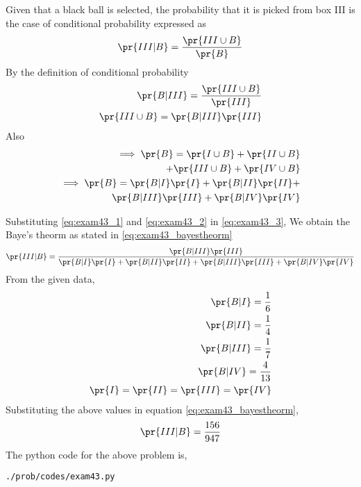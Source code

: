 Given that a black ball is selected, the probability that it is picked from box III is the case of conditional probability expressed as
\begin{align}
\pr{III|B}=\frac{\pr{III \cup B}}{\pr{B}}
\label{eq:exam43_3}
\end{align}
By the definition of conditional probability
\begin{align}
\pr{B|III}=\frac{\pr{III \cup B}}{\pr{III}}
\\
\pr{III \cup B} = \pr{B|III}\pr{III}
\label{eq:exam43_1}
\end{align}
Also 
\begin{align}
\implies \pr{B}=\pr{I \cup B}+\pr{II \cup B}
\\ +\pr{III \cup B}+\pr{IV \cup B}
\\
\implies \pr{B} = \pr{B|I} \pr{I}+\pr{B|II} \pr{II}+
\\ \pr{B|III} \pr{III}+\pr{B|IV} \pr{IV}
\label{eq:exam43_2}
\end{align}

Substituting \eqref{eq:exam43_1} and \eqref{eq:exam43_2} in \eqref{eq:exam43_3}, We obtain the Baye's theorm as stated in \eqref{eq:exam43_bayestheorm}
\begin{align}
\pr{III|B}= \frac{\pr{B|III} \pr{III}}{\pr{B|I} \pr{I}+\pr{B|II} \pr{II}+\pr{B|III} \pr{III}+\pr{B|IV} \pr{IV}}
\label{eq:exam43_bayestheorm}
\end{align}
From the given data,
\begin{align}
\pr{B|I} = \frac{1}{6}
\\
\pr{B|II} = \frac{1}{4}
\\
\pr{B|III} = \frac{1}{7}
\\
\pr{B|IV} = \frac{4}{13}
\\
\pr{I}=\pr{II}=\pr{III}=\pr{IV}
\end{align}
Substituting the above values in equation \eqref{eq:exam43_bayestheorm},
\begin{align}
\pr{III|B}=\frac{156}{947}
\end{align}
The python code for the above problem is,
\begin{lstlisting}
./prob/codes/exam43.py
\end{lstlisting}
